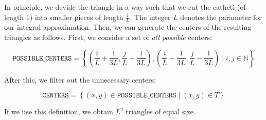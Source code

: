 \documentclass{article}
\begin{document}
In principle, we devide the triangle in a way such that we cut the catheti (of length 1) into smaller pieces of length $\frac{1}{L}$. The integer $L$ denotes the parameter for our integral approximation. Then, we can generate the centers of the resulting triangles as follows. First, we consider a set of \emph{all possible} centers:

\begin{equation*}
  \mathtt{POSSIBLE\_CENTERS} = \left\{
    \left(\frac{i}{L} + \frac{1}{3L}, \frac{j}{L} + \frac{1}{3L}\right) ,
    \left(\frac{i}{L} - \frac{1}{3L}, \frac{j}{L} - \frac{1}{3L}\right)
    \mid
    i, j\in \mathbb{N}
  \right\}
\end{equation*}

After this, we filter out the unnecessary centers:

\begin{equation*}
  \mathtt{CENTERS} = \left\{
    (x,y)\in \mathtt{POSSIBLE\_CENTERS}
    \mid
    (x,y) \in T
  \right\}
\end{equation*}

If we use this definition, we obtain $L^2$ triangles of equal size.
\end{document}
